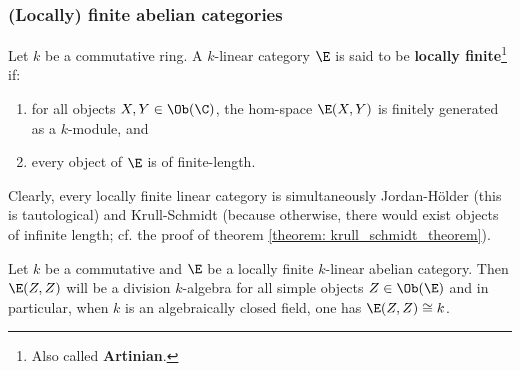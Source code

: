        \subsubsection{(Locally) finite abelian categories}
            \begin{definition} \label{def: locally_finite_linear_categories}
                Let $k$ be a commutative ring. A $k$-linear category $\E$ is said to be \textbf{locally finite}\footnote{Also called \textbf{Artinian}.} if:
                    \begin{enumerate}
                        \item for all objects $X, Y \in \Ob(\C)$, the hom-space $\E(X, Y)$ is finitely generated as a $k$-module, and
                        \item every object of $\E$ is of finite-length.
                    \end{enumerate}
            \end{definition}
            \begin{remark} \label{remark: locally_finite_linear_categories_are_jordan_holder_and_krull_schmidt}
                Clearly, every locally finite linear category is simultaneously Jordan-H\"older (this is tautological) and Krull-Schmidt (because otherwise, there would exist objects of infinite length; cf. the proof of theorem \ref{theorem: krull_schmidt_theorem}).
            \end{remark}
            \begin{proposition} \label{prop: endomorphism_algebras_of_simple_objects_in_locally_finite_linear_categories}
                Let $k$ be a commutative and $\E$ be a locally finite $k$-linear abelian category. Then $\E(Z, Z)$ will be a division $k$-algebra for all simple objects $Z \in \Ob(\E)$ and in particular, when $k$ is an algebraically closed field, one has $\E(Z, Z) \cong k$.
            \end{proposition}
